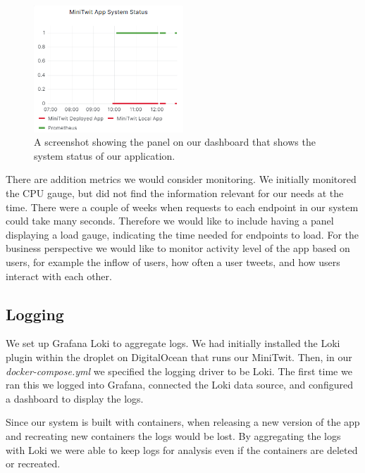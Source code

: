 \begin{figure}[H]%
\begin {center}
\includegraphics[width=0.5\textwidth]{figures/system_status.png}
\caption{A screenshot showing the panel on our dashboard that shows the system status of our application.}
\label{fig:system_status}
\end {center}
\end{figure}

There are addition metrics we would consider monitoring. We initially monitored the CPU gauge, but did not find the information relevant for our needs at the time. There were a couple of weeks when requests to each endpoint in our system could take many seconds. Therefore we would like to include having a panel displaying a load gauge, indicating the time needed for endpoints to load. For the business perspective we would like to monitor activity level of the app based on users, for example the inflow of users, how often a user tweets, and how users interact with each other.

\subsection{Logging}
We set up Grafana Loki to aggregate logs. We had initially installed the Loki plugin within the droplet on DigitalOcean that runs our MiniTwit. Then, in our \textit{docker-compose.yml} we specified the logging driver to be Loki. The first time we ran this we logged into Grafana, connected the Loki data source, and configured a dashboard to display the logs. 

Since our system is built with containers, when releasing a new version of the app and recreating new containers the logs would be lost. By aggregating the logs with Loki we were able to keep logs for analysis even if the containers are deleted or recreated.

